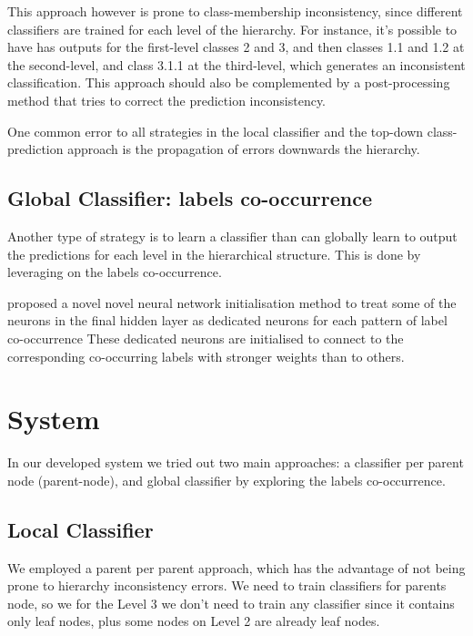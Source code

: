 \documentclass[11pt,a4paper]{article}
\begin{document}
This approach however is prone to class-membership inconsistency, since different classifiers are
trained for each level of the hierarchy. For instance, it's possible to have has outputs for the
first-level classes 2 and 3, and then classes 1.1 and 1.2 at the second-level, and class 3.1.1
at the third-level, which generates an inconsistent classification. This approach should also
be complemented by a post-processing method that tries to correct the prediction inconsistency.

One common error to all strategies in the local classifier and the top-down class-prediction
approach is the propagation of errors downwards the hierarchy.



\subsection{Global Classifier: labels co-occurrence}

Another type of strategy is to learn a classifier than can globally learn to output the predictions for each level in the hierarchical structure. This is done by leveraging on the labels co-occurrence.

\citet{kurata-etal-2016-improved} proposed a novel novel neural network initialisation method to treat some of the neurons in the final hidden layer as dedicated neurons for each pattern of label co-occurrence These dedicated neurons are initialised to connect to the corresponding co-occurring labels with stronger weights than to others.








\section{System}\label{system}

In our developed system we tried out two main approaches: a classifier per
parent node (parent-node), and global classifier by exploring the
labels co-occurrence.



\subsection{Local Classifier}

We employed a parent per parent approach, which has the advantage of not being
prone to hierarchy inconsistency errors. We need to train classifiers for
parents node, so we for the Level 3 we don't need to train any classifier
since it contains only leaf nodes, plus some nodes on Level 2 are already leaf
nodes.
\end{document}
